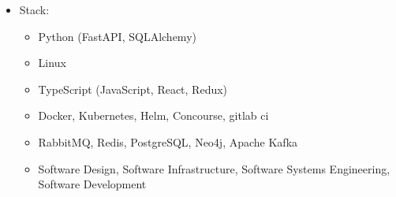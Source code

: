 \documentclass{article}
\begin{document}
\begin{itemize}
\begin{itemize}
    \end{itemize}
    \item Stack:
    \begin{itemize}
        \item Python (FastAPI, SQLAlchemy)
        \item Linux
        \item TypeScript (JavaScript, React, Redux)
        \item Docker, Kubernetes, Helm, Concourse, gitlab ci
        \item RabbitMQ, Redis, PostgreSQL, Neo4j, Apache Kafka
        \item Software Design, Software Infrastructure, Software Systems Engineering, Software Development
    \end{itemize}
\end{itemize}
\end{document}
